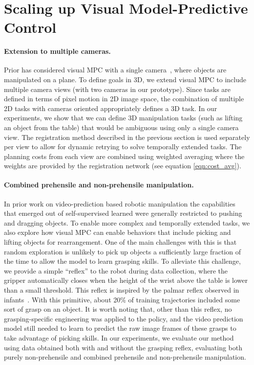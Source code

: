 \section{Scaling up Visual Model-Predictive Control}
\paragraph{Extension to multiple cameras.}
Prior has considered visual MPC with a single camera~\cite{foresight,sna}, where objects are manipulated on a plane. To define goals in 3D, we extend visual MPC to include multiple camera views (with two cameras in our prototype). Since tasks are defined in terms of pixel motion in 2D image space, the combination of multiple 2D tasks with cameras oriented appropriately defines a 3D task. In our experiments, we show that we can define 3D manipulation tasks (such as lifting an object from the table) that would be ambiguous using only a single camera view. The registration method described in the previous section is used separately per view to allow for dynamic retrying to solve temporally extended tasks. The planning costs from each view are combined using weighted averaging where the weights are provided by the registration network (see equation \ref{eqn:cost_avg}). 

\vspace{-0.1in}
\paragraph{Combined prehensile and non-prehensile manipulation.}
In prior work on video-prediction based robotic manipulation \cite{sna, foresight} the capabilities that emerged out of self-supervised learned were generally restricted to pushing and dragging objects. To enable more complex and temporally extended tasks, we also explore how visual MPC can enable behaviors that include picking and lifting objects for rearrangement. One of the main challenges with this is that random exploration is unlikely to pick up objects a sufficiently large fraction of the time to allow the model to learn grasping skills. To alleviate this challenge, we provide a simple ``reflex'' to the robot during data collection, where the gripper automatically closes when the height of the wrist above the table is lower than a small threshold. This reflex is inspired by the palmar reflex observed in infants~\cite{grasping_fetal}. With this primitive, about 20\% of training trajectories included some sort of grasp on an object. It is worth noting that, other than this reflex, no grasping-specific engineering was applied to the policy, and the video prediction model still needed to learn to predict the raw image frames of these grasps to take advantage of picking skills. In our experiments, we evaluate our method using data obtained both with and without the grasping reflex, evaluating both purely non-prehensile and combined prehensile and non-prehensile manipulation.

